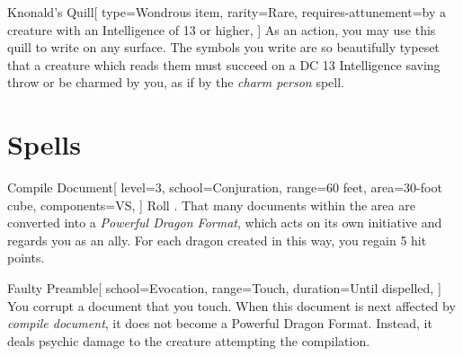 \documentclass[theme=dnd]{rpgbook}
\begin{document}
			\begin{RpgItem}{Knonald's Quill}[
					type={Wondrous item},
					rarity=Rare,
					requires-attunement={by a creature with an Intelligence of 13 or higher},
				]
				As an action, you may use this quill to write on any surface. The symbols you write are so beautifully typeset that a creature which reads them must succeed on a DC 13 Intelligence saving throw or be charmed by you, as if by the \textit{charm person} spell.
			\end{RpgItem}

		\section{Spells}

			\begin{RpgSpell}{Compile Document}[
					level=3,
					school=Conjuration,
					range={60 feet},
					area={30-foot cube},
					components=VS,
				]
				Roll . That many documents within the area are converted into a \textit{Powerful Dragon Format}, which acts on its own initiative and regards you as an ally. For each dragon created in this way, you regain 5 hit points.

			\end{RpgSpell}
			\begin{RpgSpell}{Faulty Preamble}[
					school=Evocation,
					range=Touch,
					duration={Until dispelled},
				]
				You corrupt a document that you touch. When this document is next affected by \textit{compile document}, it does not become a Powerful Dragon Format. Instead, it deals  psychic damage to the creature attempting the compilation.

			\end{RpgSpell}
\end{document}
